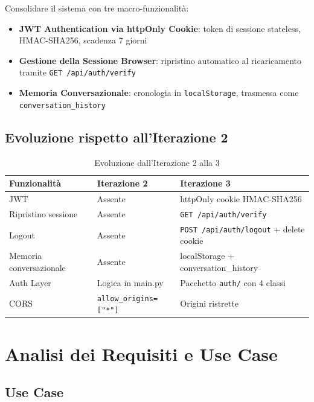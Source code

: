 \documentclass[a4paper,12pt]{report}
\begin{document}
Consolidare il sistema con tre macro-funzionalità:
\begin{itemize}
    \item \textbf{JWT Authentication via httpOnly Cookie}: token di sessione stateless, HMAC-SHA256, scadenza 7 giorni
    \item \textbf{Gestione della Sessione Browser}: ripristino automatico al ricaricamento tramite \texttt{GET /api/auth/verify}
    \item \textbf{Memoria Conversazionale}: cronologia in \texttt{localStorage}, trasmessa come \texttt{conversation\_history}
\end{itemize}

\subsection{Evoluzione rispetto all'Iterazione 2}

\begin{table}[H]
\centering
\small
\begin{tabularx}{\textwidth}{l X X}
\toprule
\textbf{Funzionalità} & \textbf{Iterazione 2} & \textbf{Iterazione 3} \\
\midrule
JWT & Assente & httpOnly cookie HMAC-SHA256 \\
Ripristino sessione & Assente & \texttt{GET /api/auth/verify} \\
Logout & Assente & \texttt{POST /api/auth/logout} + delete cookie \\
Memoria conversazionale & Assente & localStorage + conversation\_history \\
Auth Layer & Logica in main.py & Pacchetto \texttt{auth/} con 4 classi \\
CORS & \texttt{allow\_origins=["*"]} & Origini ristrette \\
\bottomrule
\end{tabularx}
\caption{Evoluzione dall'Iterazione 2 alla 3}
\end{table}

\section{Analisi dei Requisiti e Use Case}

\subsection{Use Case}
\end{document}

